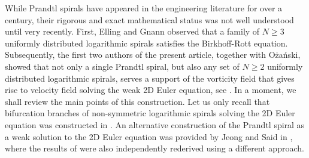 \documentclass[11pt, letterpaper, reqno]{amsart}
\numberwithin{equation}{section}
\theoremstyle{definition}
\theoremstyle{plain}
\numberwithin{equation}{section}
\begin{document}
While Prandtl spirals have appeared in the engineering literature for over a century, their rigorous and exact mathematical status was not well understood until very recently. First, Elling and Gnann \cite{Elling} observed that a family of $N\geq 3$ uniformly distributed logarithmic spirals satisfies the Birkhoff-Rott equation. Subsequently, the first two authors of the present article, together with O\.za\'nski, showed that not only a single Prandtl spiral, but also any set of $N\geq 2$ uniformly distributed logarithmic spirals, serves a support of the vorticity field that gives rise to velocity field solving the weak 2D Euler equation, see \cite{CKO}. In a moment, we shall review the main points of this construction. Let us only recall that bifurcation branches of non-symmetric logarithmic spirals solving the 2D Euler equation was constructed in \cite{CKO2}. An alternative construction of the Prandtl spiral as a weak solution to the 2D Euler equation was provided by Jeong and Said in \cite{JS}, where the results of \cite{CKO2} were also independently rederived using a different approach.
\end{document}
